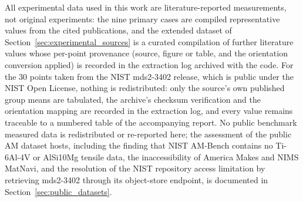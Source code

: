 \documentclass[twocolumn]{sagej}
\begin{document}
All experimental data used in this work are literature-reported measurements, not original experiments: the nine primary cases are compiled representative values from the cited publications, and the extended dataset of Section~\ref{sec:experimental_sources} is a curated compilation of further literature values whose per-point provenance (source, figure or table, and the orientation conversion applied) is recorded in the extraction log archived with the code. For the 30 points taken from the NIST mds2-3402 release, which is public under the NIST Open License, nothing is redistributed: only the source's own published group means are tabulated, the archive's checksum verification and the orientation mapping are recorded in the extraction log, and every value remains traceable to a numbered table of the accompanying report. No public benchmark measured data is redistributed or re-reported here; the assessment of the public AM dataset hosts, including the finding that NIST AM-Bench contains no Ti-6Al-4V or AlSi10Mg tensile data, the inaccessibility of America Makes and NIMS MatNavi, and the resolution of the NIST repository access limitation by retrieving mds2-3402 through its object-store endpoint, is documented in Section~\ref{sec:public_datasets}.

\end{document}
